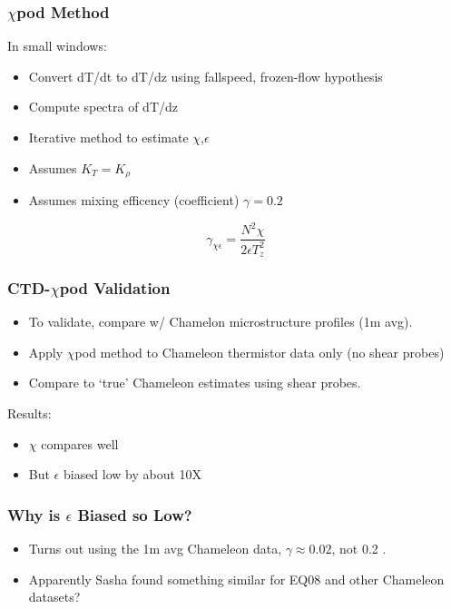 \documentclass{beamer}
\begin{document}
\begin{frame}
 \frametitle{$\chi$pod Method}

In small windows:
   \begin{itemize}
  \item Convert dT/dt to dT/dz using fallspeed, frozen-flow hypothesis
  \item  Compute spectra of dT/dz
  \item Iterative method to estimate $\chi$,$\epsilon$
  \item Assumes $K_T=K_{\rho}$
  \item Assumes mixing efficency (coefficient) $\gamma=0.2$
  \end{itemize}

\begin{equation}
\gamma_{\chi\epsilon}=\frac{N^2 \chi}{2\epsilon T_{z}^{2}} 
\end{equation}

\end{frame}



\begin{frame}
 \frametitle{CTD-$\chi$pod Validation}

   \begin{itemize}
  \item To validate, compare w/ Chamelon microstructure profiles (1m avg).
  \item Apply $\chi$pod method to Chameleon thermistor data only (no shear probes)
  \item Compare to `true' Chameleon estimates using shear probes.
  \end{itemize}

Results:
   \begin{itemize}
  \item $\chi$ compares well
  \item But $\epsilon$ biased low by about 10X
    \end{itemize}

\end{frame}




\begin{frame}
 \frametitle{Why is $\epsilon$ Biased so Low?}

\begin{itemize}
\item Turns out using the 1m avg Chameleon data, $\gamma \approx 0.02$, not 0.2  .
\item Apparently Sasha found something similar for EQ08 and other Chameleon datasets?
\end{itemize}

\end{frame}
\end{document}
